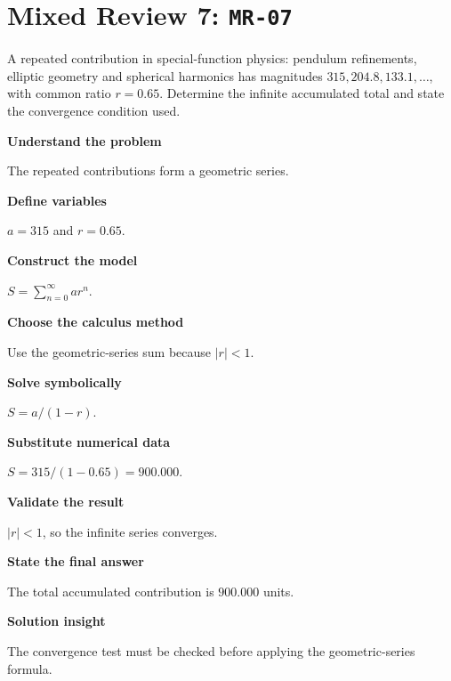 \documentclass[11pt]{book}
\newcommand{\pid}[1]{\texttt{#1}}
\begin{document}
\section*{Mixed Review 7: \pid{MR-07}}
\begin{problembox}A repeated contribution in special-function physics: pendulum refinements, elliptic geometry and spherical harmonics has magnitudes $315, 204.8, 133.1,\ldots$, with common ratio $r=0.65$. Determine the infinite accumulated total and state the convergence condition used.\end{problembox}
\begin{solutionbox}
\textbf{Understand the problem}\par The repeated contributions form a geometric series.\par\medskip
\textbf{Define variables}\par $a=315$ and $r=0.65$.\par\medskip
\textbf{Construct the model}\par $S=\sum_{n=0}^{\infty}ar^n$.\par\medskip
\textbf{Choose the calculus method}\par Use the geometric-series sum because $|r|<1$.\par\medskip
\textbf{Solve symbolically}\par $S=a/(1-r)$.\par\medskip
\textbf{Substitute numerical data}\par $S=315/(1-0.65)=900.000$.\par\medskip
\textbf{Validate the result}\par $|r|<1$, so the infinite series converges.\par\medskip
\textbf{State the final answer}\par The total accumulated contribution is $900.000$ units.\par\medskip
\textbf{Solution insight}\par The convergence test must be checked before applying the geometric-series formula.\par\medskip
\end{solutionbox}
\end{document}

